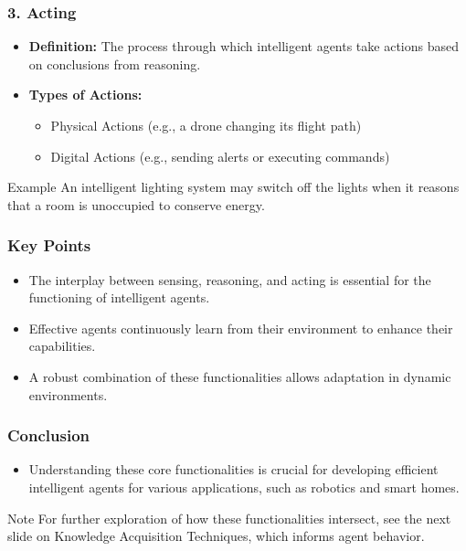 \documentclass[aspectratio=169]{beamer}
\begin{document}
\begin{frame}[fragile]
    \frametitle{3. Acting}
    \begin{itemize}
        \item \textbf{Definition:} The process through which intelligent agents take actions based on conclusions from reasoning.
        \item \textbf{Types of Actions:}
        \begin{itemize}
            \item Physical Actions (e.g., a drone changing its flight path)
            \item Digital Actions (e.g., sending alerts or executing commands)
        \end{itemize}
    \end{itemize}
    \begin{block}{Example}
        An intelligent lighting system may switch off the lights when it reasons that a room is unoccupied to conserve energy.
    \end{block}
\end{frame}

\begin{frame}[fragile]
    \frametitle{Key Points}
    \begin{itemize}
        \item The interplay between sensing, reasoning, and acting is essential for the functioning of intelligent agents.
        \item Effective agents continuously learn from their environment to enhance their capabilities.
        \item A robust combination of these functionalities allows adaptation in dynamic environments.
    \end{itemize}
\end{frame}

\begin{frame}[fragile]
    \frametitle{Conclusion}
    \begin{itemize}
        \item Understanding these core functionalities is crucial for developing efficient intelligent agents for various applications, such as robotics and smart homes.
    \end{itemize}
    \begin{block}{Note}
        For further exploration of how these functionalities intersect, see the next slide on Knowledge Acquisition Techniques, which informs agent behavior.
    \end{block}
\end{frame}
\end{document}
